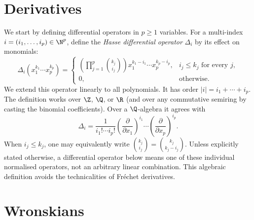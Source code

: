 \maketitle

\section{Derivatives}

We start by defining differential operators in $p\geq1$ variables.
For a multi-index $i=(i_1,\dots,i_p)\in\N^p$, define the \emph{Hasse differential operator}
$\Delta_i$ by its effect on monomials:
\[
\Delta_i(x_1^{k_1}\cdots x_p^{k_p})=
\begin{cases}
\displaystyle\left(\prod_{j=1}^p {k_j\choose i_j}\right)
 x_1^{k_1-i_1}\cdots x_p^{k_p-i_p},& i_j\leq k_j\text{ for every }j,\\[3pt]
0,&\text{otherwise}.
\end{cases}
\]
We extend this operator linearly to all polynomials. It has order
$|i|=i_1+\cdots+i_p$. The definition works over $\Z$, $\Q$, or $\R$
(and over any commutative semiring by casting the binomial coefficients).
Over a $\Q$-algebra it agrees with
\[
\Delta_i=\frac{1}{i_1!\cdots i_p!}
 \left(\frac{\partial}{\partial x_1}\right)^{i_1}\cdots
 \left(\frac{\partial}{\partial x_p}\right)^{i_p}.
\]
When $i_j\leq k_j$, one may equivalently write
${k_j\choose i_j}={k_j\choose k_j-i_j}$.
Unless explicitly stated otherwise, a differential operator below means one
of these individual normalised operators, not an arbitrary linear combination.
This algebraic definition avoids the technicalities of Fr\'echet derivatives.


\section{Wronskians}
